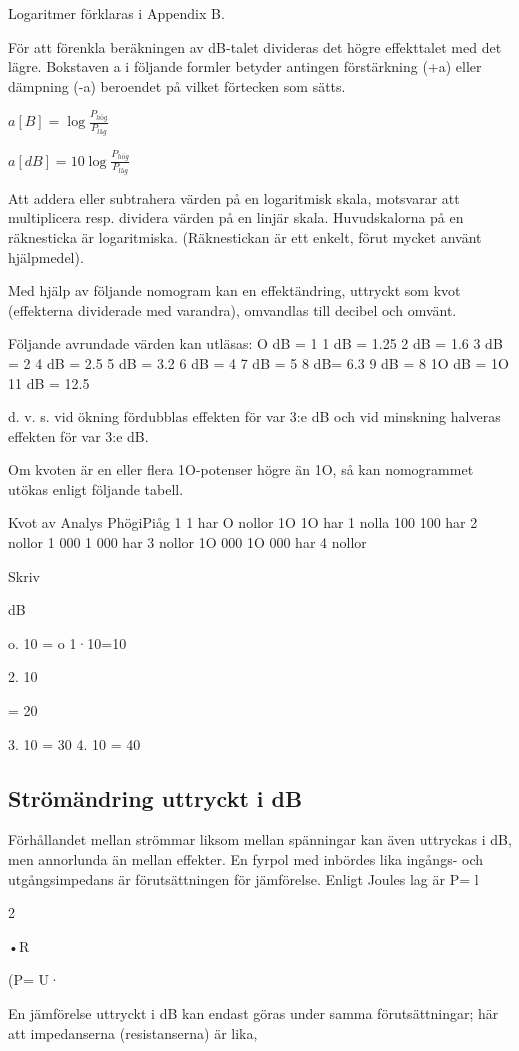 Logaritmer förklaras i Appendix B.

För att förenkla beräkningen av dB-talet divideras det högre effekttalet med det
lägre. Bokstaven a i följande formler betyder antingen förstärkning (+a) eller
dämpning (-a) beroendet på vilket förtecken som sätts.

$a[B] = \log \frac{P_{hög}}{P_{låg}}$

$a[dB] = 10\log \frac{P_{hög}}{P_{låg}}$

Att addera eller subtrahera värden på en logaritmisk skala, motsvarar att
multiplicera resp. dividera värden på en linjär skala. Huvudskalorna på en
räknesticka är logaritmiska. (Räknestickan är ett enkelt, förut mycket använt
hjälpmedel).

Med hjälp av följande nomogram kan en effektändring, uttryckt som kvot
(effekterna dividerade med varandra), omvandlas till decibel och omvänt.


Följande avrundade värden kan utläsas:
O dB = 1 1 dB = 1.25 2 dB = 1.6
3 dB = 2 4 dB = 2.5 5 dB = 3.2
6 dB = 4 7 dB = 5 8 dB= 6.3
9 dB = 8 1O dB = 1O 11 dB = 12.5

d. v. s. vid ökning fördubblas effekten för var 3:e dB och vid minskning
halveras effekten för var 3:e dB.

Om kvoten är en eller flera 1O-potenser högre än 1O, så kan nomogrammet utökas
enligt följande tabell.

Kvot av Analys
PhögiPiåg
1
1 har O nollor
1O
1O har 1 nolla
100
100 har 2 nollor
1 000
1 000 har 3 nollor
1O 000 1O 000 har 4 nollor

Skriv

dB

o. 10 = o
1·10=10

2. 10

= 20

3. 10 = 30
4. 10 = 40

\subsection{Strömändring uttryckt i dB}
Förhållandet mellan strömmar liksom mellan spänningar kan även uttryckas i dB, men
annorlunda än mellan effekter. En fyrpol
med inbördes lika ingångs- och utgångsimpedans är förutsättningen för jämförelse.
Enligt Joules lag är P= l

2

•R

(P= U·~

En jämförelse uttryckt i dB kan endast göras
under samma förutsättningar; här att impedanserna (resistanserna) är lika,

